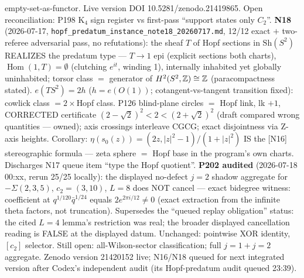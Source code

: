 \documentclass[10pt]{article}
\begin{document}
empty-set-as-functor. Live version DOI 10.5281/zenodo.21419865. Open reconciliation: P198 K$_4$ sign register vs first-pass ``support states only $C_2$''. \textbf{N18} (2026-07-17, \texttt{hopf\_predatum\_instance\_note18\_20260717.md}, 12/12 exact $+$ two-referee adversarial pass, no refutations): the sheaf $T$ of Hopf sections in $\mathrm{Sh}(S^2)$ REALIZES the predatum type --- $T\to1$ epi (explicit sections both charts), $\operatorname{Hom}(1,T)=\emptyset$ (clutching $e^{it}$, winding 1), internally inhabited yet globally uninhabited; torsor class $=$ generator of $H^2(S^2,\mathbb Z)\cong\mathbb Z$ (paracompactness stated). $e(TS^2)=2h$ ($h=e(O(1))$; cotangent-vs-tangent transition fixed): cowlick class $=2\times$Hopf class. P126 blind-plane circles $=$ Hopf link, lk $+1$, CORRECTED certificate $(2-\sqrt2)^2<2<(2+\sqrt2)^2$ (draft compared wrong quantities --- owned); axis crossings interleave CGCG; exact disjointness via Z-axis heights. Corollary: $\eta(s_0(z))=(2z,|z|^2{-}1)/(1{+}|z|^2)$ IS the [N16] stereographic formula --- zeta sphere $=$ Hopf base in the program's own charts. Discharges N17 queue item ``type the Hopf quotient''. \textbf{P202 audited} (2026-07-18 00:xx, rerun 25/25 locally): the displayed no-defect $j{=}2$ shadow aggregate for $-\Sigma(2,3,5)$, $c_2=(3,10)$, $L=8$ does NOT cancel --- exact bidegree witness: coefficient at $q^{1/120}\bar q^{1/24}$ equals $2e^{2\pi i/12}\ne0$ (exact extraction from the infinite theta factors, not truncation). Supersedes the ``queued replay obligation'' status: the cited $L{=}4$ lemma's restriction was real; the broader displayed cancellation reading is FALSE at the displayed datum. Unchanged: pointwise XOR identity, $[c_2]$ selector. Still open: all-Wilson-sector classification; full $j{=}1{+}j{=}2$ aggregate. Zenodo version 21420152 live; N16/N18 queued for next integrated version after Codex's independent audit (its Hopf-predatum audit queued 23:39).
\end{document}
